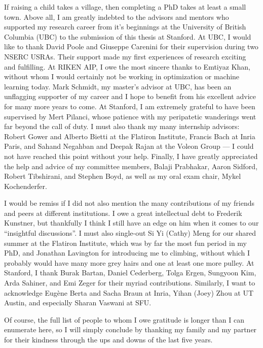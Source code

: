 

If raising a child takes a village, then completing a PhD takes at least a
small town.
Above all, I am greatly indebted to the advisors and mentors who supported my
research career from it's beginnings at the University of British Columbia
(UBC) to the submission of this thesis at Stanford.
At UBC, I would like to thank David Poole and Giuseppe Carenini for their
supervision during two NSERC USRAs.
Their support made my first experiences of research exciting and fulfilling.
At RIKEN AIP, I owe the most sincere thanks to Emtiyaz Khan, without whom I
would certainly not be working in optimization or machine learning today.
Mark Schmidt, my master's advisor at UBC, has been an unflagging supporter of
my career and I hope to benefit from his excellent advice for many more years
to come.
At Stanford, I am extremely grateful to have been supervised by Mert Pilanci,
whose patience with my peripatetic wanderings went far beyond the call of duty.
I must also thank my many internship advisors: Robert Gower and Alberto Bietti at
the Flatiron Institute, Francis Bach at Inria Paris, and Sahand Negahban and
Deepak Rajan at the Voleon Group --- I could not have reached this point without
your help.
Finally, I have greatly appreciated the help and advice of my committee members,
Balaji Prabhakar, Aaron Sidford, Robert Tibshirani, and Stephen Boyd,
as well as my oral exam chair, Mykel Kochenderfer.

I would be remiss if I did not also mention the many contributions of my
friends and peers at different institutions.
I owe a great intellectual debt to Frederik Kunstner, but thankfully I think I
still have an edge on him when it comes to our ``insightful discussions''.
I must also single-out Si Yi (Cathy) Meng for our shared summer at the Flatiron
Institute, which was by far the most fun period in my PhD, and Jonathan
Lavington for introducing me to climbing, without which I probably would have
many more grey hairs and one at least one more pulley.
At Stanford, I thank Burak Bartan, Daniel Cederberg, Tolga Ergen, Sungyoon Kim,
Arda Sahiner, and Emi Zeger for their myriad contributions.
Similarly, I want to acknowledge Eugène Berta and Sacha Braun at Inria, Yihan
(Joey) Zhou at UT Austin, and especially Sharan Vaswani at SFU.

Of course, the full list of people to whom I owe gratitude is longer than I can
enumerate here, so I will simply conclude by thanking my family and my partner
for their kindness through the ups and downs of the last five years.
